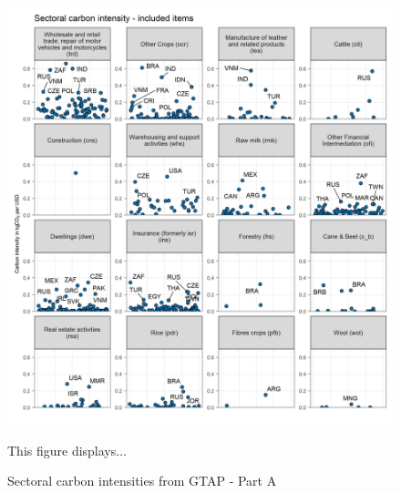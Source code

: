 \documentclass[12pt, a4paper]{article}
\newenvironment{subcaption}
{\strut
\vspace{-5pt}
\begin{minipage}[b]{0.9\textwidth}
  \hspace*{-\parindent}
  \footnotesize}
 {\end{minipage}}
\begin{document}






\begin{figure}[ht!]
  \centering
  \caption{Sectoral carbon intensities from GTAP - Part A} \label{fig:B1}
  \includegraphics{Analysis_Carbon_Intensities_GTAP/Figure_2.1.1_A_2017}
  \begin{subcaption}
    This figure displays...
  \end{subcaption}

\end{figure}
\end{document}
